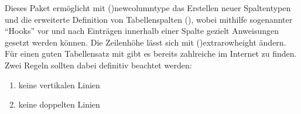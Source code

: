 \begin{DeclarePackages}[Tabellen|?]
  Dieses Paket ermöglicht mit \Macro(){newcolumntype} das 
  Erstellen neuer Spaltentypen und die erweiterte Definition von Tabellenspalten
  (\PValue{>\MPValue{\dots}}\PValue{<\MPValue{\dots}}), 
  wobei mithilfe sogenannter \enquote{Hooks} vor und nach Einträgen innerhalb 
  einer Spalte gezielt Anweisungen gesetzt werden können. Die Zeilenhöhe lässt 
  sich mit \Macro(){extrarowheight} ändern. 
  Für einen guten Tabellensatz mit  gibt es bereits zahlreiche 
   im 
  Internet zu finden. Zwei Regeln sollten dabei definitiv beachtet werden:
  \begin{enumerate}[itemindent=0pt,labelwidth=*,labelsep=1em,label=\Roman*.]
  \item keine vertikalen Linien
  \item keine doppelten Linien
  \end{enumerate}
  

\end{DeclarePackages}
